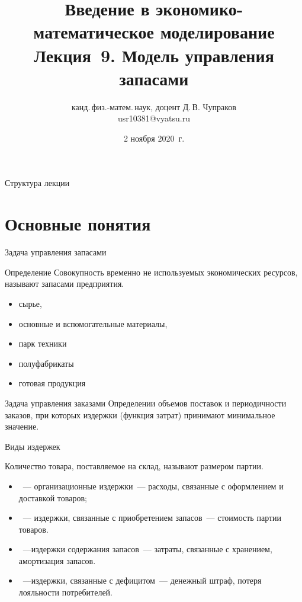\documentclass[unicode,11pt,notheorems,xcolor=table]{beamer}
\author[Д.\,В. Чупраков]{канд.\,физ.-матем.\,наук, доцент Д.\,В. Чупраков\\[6pt] usr10381@vyatsu.ru}
\institute[ВятГУ]{ФГБОУ ВО Вятский государственный университет}
\title[Лекция~9. Модель управления запасами]{
	Введение в экономико-математическое моделирование\\[12pt]
	Лекция~9. Модель управления запасами}
\date{2 ноября 2020~г.}
\begin{document}
\maketitle

\begin{frame}{Структура лекции}
	\tableofcontents
\end{frame}

\section{Основные понятия}

\begin{frame}{Задача управления запасами}
    \begin{block}{Определение}
        Совокупность временно не используемых экономических ресурсов, называют \alert{запасами предприятия}. 
    \end{block}

    \begin{itemize}
        \item сырье, 
        \item основные и вспомогательные материалы, 
        \item парк техники
        \item полуфабрикаты
        \item готовая продукция
    \end{itemize}

    \pause
    \begin{block}{Задача управления заказами}
        Определении объемов поставок и периодичности заказов, при которых издержки (функция затрат) принимают минимальное значение.
    \end{block}
\end{frame}

\begin{frame}{Виды издержек}
    
    Количество товара, поставляемое на склад, называют \alert{размером партии.}
    
    \begin{itemize}
        \item {}~--- \alert{организационные издержки}~--- расходы, связанные с оформлением и доставкой товаров;
        \item {}~--- \alert{издержки, связанные с приобретением запасов}~--- стоимость партии товаров. 
        \item {}~---\alert{издержки содержания запасов}~--- затраты, связанные с хранением, амортизация запасов. 
        \item  {}~---\alert{издержки, связанные с дефицитом}~--- денежный штраф, потеря лояльности потребителей.
    \end{itemize}
\end{frame}
\end{document}
